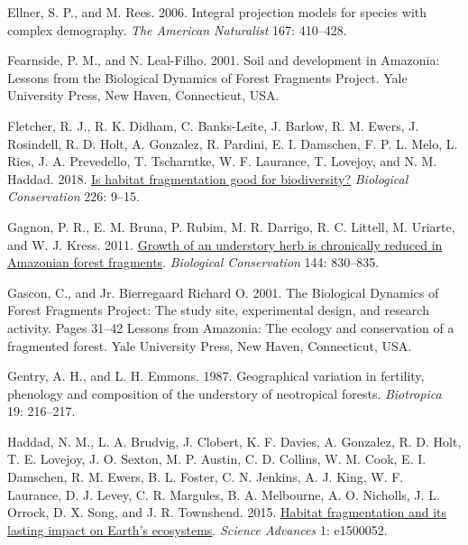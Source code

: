 \documentclass[
  12pt,
  man, donotrepeattitle,floatsintext]{apa6}
\newlength{\cslhangindent}
\newlength{\cslentryspacingunit} %
\newenvironment{CSLReferences}[2] %
 {%
  \setlength{\parindent}{0pt}
  \ifodd #1
  \let\oldpar\par
  \def\par{\hangindent=\cslhangindent\oldpar}
  \fi
  \setlength{\parskip}{#2\cslentryspacingunit}
 }%
 {}
\begin{document}
\begin{CSLReferences}{1}{0}
\leavevmode{}%
Ellner, S. P., and M. Rees. 2006. Integral projection models for species with complex demography. \emph{The American Naturalist} 167: 410--428.

\leavevmode{}%
Fearnside, P. M., and N. Leal-Filho. 2001. Soil and development in {Amazonia}: {Lessons} from the {Biological} {Dynamics} of {Forest} {Fragments} {Project}. Yale University Press, New Haven, Connecticut, USA.

\leavevmode{}%
Fletcher, R. J., R. K. Didham, C. Banks-Leite, J. Barlow, R. M. Ewers, J. Rosindell, R. D. Holt, A. Gonzalez, R. Pardini, E. I. Damschen, F. P. L. Melo, L. Ries, J. A. Prevedello, T. Tscharntke, W. F. Laurance, T. Lovejoy, and N. M. Haddad. 2018. \href{https://doi.org/10.1016/j.biocon.2018.07.022}{Is habitat fragmentation good for biodiversity?} \emph{Biological Conservation} 226: 9--15.

\leavevmode{}%
Gagnon, P. R., E. M. Bruna, P. Rubim, M. R. Darrigo, R. C. Littell, M. Uriarte, and W. J. Kress. 2011. \href{https://doi.org/10.1016/j.biocon.2010.11.015}{Growth of an understory herb is chronically reduced in {Amazonian} forest fragments}. \emph{Biological Conservation} 144: 830--835.

\leavevmode{}%
Gascon, C., and Jr. Bierregaard Richard O. 2001. The {Biological} {Dynamics} of {Forest} {Fragments} {Project}: The study site, experimental design, and research activity. Pages 31--42 Lessons from {Amazonia}: The ecology and conservation of a fragmented forest. Yale University Press, New Haven, Connecticut, USA.

\leavevmode{}%
Gentry, A. H., and L. H. Emmons. 1987. Geographical variation in fertility, phenology and composition of the understory of neotropical forests. \emph{Biotropica} 19: 216--217.

\leavevmode{}%
Haddad, N. M., L. A. Brudvig, J. Clobert, K. F. Davies, A. Gonzalez, R. D. Holt, T. E. Lovejoy, J. O. Sexton, M. P. Austin, C. D. Collins, W. M. Cook, E. I. Damschen, R. M. Ewers, B. L. Foster, C. N. Jenkins, A. J. King, W. F. Laurance, D. J. Levey, C. R. Margules, B. A. Melbourne, A. O. Nicholls, J. L. Orrock, D. X. Song, and J. R. Townshend. 2015. \href{https://doi.org/10.1126/sciadv.1500052}{Habitat fragmentation and its lasting impact on {Earth}'s ecosystems}. \emph{Science Advances} 1: e1500052.


\end{CSLReferences}
\end{document}
